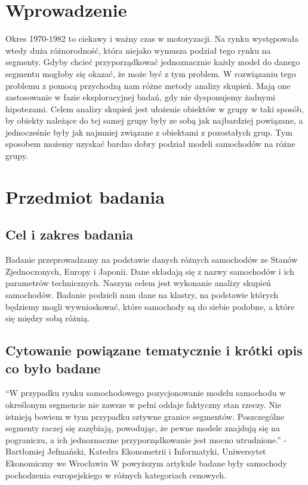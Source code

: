 \documentclass{article}
\begin{document}
\section{Wprowadzenie}
Okres 1970-1982 to ciekawy i ważny czas w motoryzacji. Na rynku występowała wtedy duża różnorodność, która niejako wymusza podział tego rynku na segmenty. Gdyby chcieć przyporządkować jednoznacznie każdy model do danego segmentu mogłoby się okazać, że może być z tym problem. W rozwiązaniu tego problemu z pomocą przychodzą nam różne metody analizy skupień. Mają one zastosowanie w fazie eksploracyjnej badań, gdy nie dysponujemy żadnymi hipotezami. Celem analizy skupień jest ułożenie obiektów w grupy w taki sposób, by obiekty należące do tej samej grupy były ze sobą jak najbardziej powiązane, a jednocześnie były jak najmniej związane z obiektami z pozostałych grup. Tym sposobem możemy uzyskać bardzo dobry podział modeli samochodów na różne grupy.
\section{Przedmiot badania}
    \subsection{Cel i zakres badania} 
    Badanie przeprowadzamy na podstawie danych różnych samochodów ze Stanów Zjednoczonych, Europy i Japonii. 
    Dane składają się z nazwy samochodów i ich parametrów technicznych.
    \newline\newline
    Naszym celem jest wykonanie analizy skupień samochodów. Badanie podzieli nam dane na klastry, na podstawie których będziemy mogli 
    wywnioskować, które samochody są do siebie podobne, a które się między sobą różnią. 
    \newline
    \subsection{Cytowanie powiązane tematycznie i krótki opis co było badane}
    ``W przypadku rynku samochodowego pozycjonowanie modelu samochodu w określonym segmencie nie zawsze w pełni oddaje faktyczny stan rzeczy. Nie istnieją bowiem w tym przypadku sztywne granice segmentów. Poszczególne segmenty raczej się zazębiają, powodując, że pewne modele znajdują się na pograniczu, a ich jednoznaczne przyporządkowanie jest mocno utrudnione.'' \newline- Bartłomiej Jefmański, Katedra Ekonometrii i Informatyki, Uniwersytet Ekonomiczny we Wrocławiu
    \newline\newline
    W powyższym artykule badane były samochody pochodzenia europejskiego w różnych kategoriach cenowych.
\end{document}
